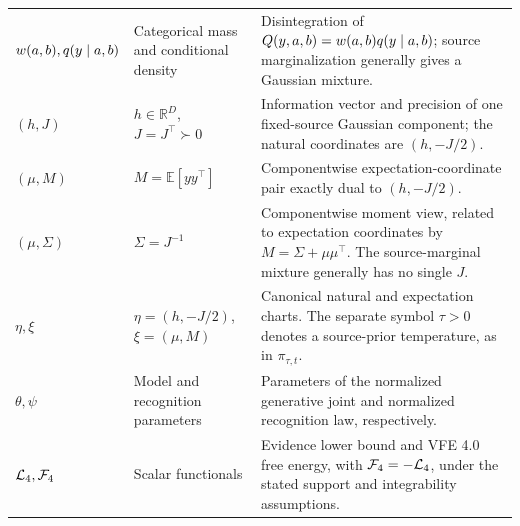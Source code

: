 {\begin{longtable}{>{\raggedright\arraybackslash}p{} >{\raggedright\arraybackslash}p{} >{\raggedright\arraybackslash}p{}}
\addlinespace
$w(a,b),q(y\mid a,b)$ & Categorical mass and conditional density & Disintegration of $Q(y,a,b)=w(a,b)q(y\mid a,b)$; source marginalization generally gives a Gaussian mixture. \\
\addlinespace
$(h,J)$ & $h\in\mathbb R^D$, $J=J^\top\succ0$ & Information vector and precision of one fixed-source Gaussian component; the natural coordinates are $(h,-J/2)$. \\
\addlinespace
$(\mu,M)$ & $M=\mathbb E[yy^\top]$ & Componentwise expectation-coordinate pair exactly dual to $(h,-J/2)$. \\
\addlinespace
$(\mu,\Sigma)$ & $\Sigma=J^{-1}$ & Componentwise moment view, related to expectation coordinates by $M=\Sigma+\mu\mu^\top$. The source-marginal mixture generally has no single $J$. \\
\addlinespace
$\eta,\xi$ & $\eta=(h,-J/2)$, $\xi=(\mu,M)$ & Canonical natural and expectation charts. The separate symbol $\tau>0$ denotes a source-prior temperature, as in $\pi_{\tau,t}$. \\
\addlinespace
$\theta,\psi$ & Model and recognition parameters & Parameters of the normalized generative joint and normalized recognition law, respectively. \\
\addlinespace
$\mathcal L_4,\mathcal F_4$ & Scalar functionals & Evidence lower bound and VFE 4.0 free energy, with $\mathcal F_4=-\mathcal L_4$, under the stated support and integrability assumptions. \\
\end{longtable}
}
